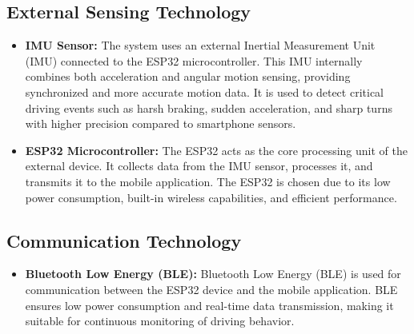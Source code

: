 \subsection{External Sensing Technology}
\begin{itemize}
    \item \textbf{IMU Sensor:} The system uses an external Inertial Measurement Unit (IMU) connected to the ESP32 microcontroller. This IMU internally combines both acceleration and angular motion sensing, providing synchronized and more accurate motion data. It is used to detect critical driving events such as harsh braking, sudden acceleration, and sharp turns with higher precision compared to smartphone sensors.
    \item \textbf{ESP32 Microcontroller:} The ESP32 acts as the core processing unit of the external device. It collects data from the IMU sensor, processes it, and transmits it to the mobile application. The ESP32 is chosen due to its low power consumption, built-in wireless capabilities, and efficient performance.
\end{itemize}

\subsection{Communication Technology}
\begin{itemize}
    \item \textbf{Bluetooth Low Energy (BLE):} Bluetooth Low Energy (BLE) is used for communication between the ESP32 device and the mobile application. BLE ensures low power consumption and real-time data transmission, making it suitable for continuous monitoring of driving behavior.
\end{itemize}

